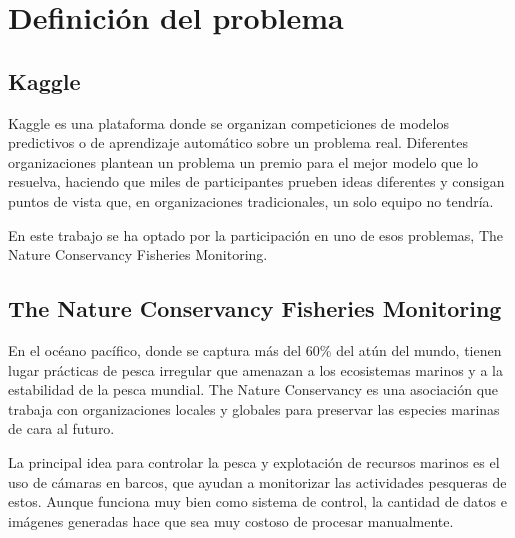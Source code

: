 
\chapter{Definición del problema}

\label{Chapter5} %


\section{Kaggle}

Kaggle es una plataforma donde se organizan competiciones de modelos predictivos o de aprendizaje automático sobre un problema real. Diferentes organizaciones plantean un problema un premio para el mejor modelo que lo resuelva, haciendo que miles de participantes prueben ideas diferentes y consigan puntos de vista que, en organizaciones tradicionales, un solo equipo no tendría.

En este trabajo se ha optado por la participación en uno de esos problemas, The Nature Conservancy Fisheries Monitoring.

\section{The Nature Conservancy Fisheries Monitoring}

En el océano pacífico, donde se captura más del 60\% del atún del mundo, tienen lugar prácticas de pesca irregular que amenazan a los ecosistemas marinos y a la estabilidad de la pesca mundial. The Nature Conservancy es una asociación que trabaja con organizaciones locales y globales para preservar las especies marinas de cara al futuro.

La principal idea para controlar la pesca y explotación de recursos marinos es el uso de cámaras en barcos, que ayudan a monitorizar las actividades pesqueras de estos. Aunque funciona muy bien como sistema de control, la cantidad de datos e imágenes generadas hace que sea muy costoso de procesar manualmente.

\begin{center}
\end{center}

